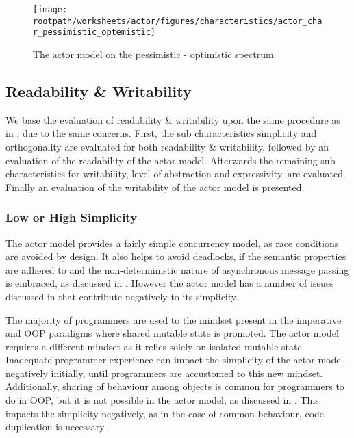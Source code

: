 \begin{figure}[htbp]
\centering
 \texttt{[image: \\rootpath/worksheets/actor/figures/characteristics/actor\_char\_pessimistic\_optemistic]} 
 \caption{The actor model on the pessimistic - optimistic spectrum}
\label{fig:actor_pes_opti}
\end{figure}

\subsection{Readability \& Writability}
We base the evaluation of readability \& writability upon the same procedure as in , due to the same concerns. First, the sub characteristics simplicity and orthogonality are evaluated for both readability \& writability, followed by an evaluation of the readability of the actor model. Afterwards the remaining sub characteristics for writability, level of abstraction and expressivity, are evaluated. Finally an evaluation of the writability of the actor model is presented.

\subsubsection{Low or High Simplicity}\label{subsec:actor_simplicity_read}
The actor model provides a fairly simple concurrency model, as race conditions are avoided by design. It also helps to avoid deadlocks, if the semantic properties are adhered to and the non-deterministic nature of asynchronous message passing is embraced, as discussed in . However the actor model has a number of issues discussed in  that contribute negatively to its simplicity.

The majority of programmers are used to the mindset present in the imperative and \ac{OOP} paradigms where shared mutable state is promoted. The actor model requires a different mindset as it relies solely on isolated mutable state\cite[p. 9]{karmani2009actor}. Inadequate programmer experience can impact the simplicity of the actor model negatively initially, until programmers are accustomed to this new mindset. Additionally, sharing of behaviour among objects is common for programmers to do in \ac{OOP}, but it is not possible in the actor model, as discussed in . This impacts the simplicity negatively, as in the case of common behaviour, code duplication is necessary.

